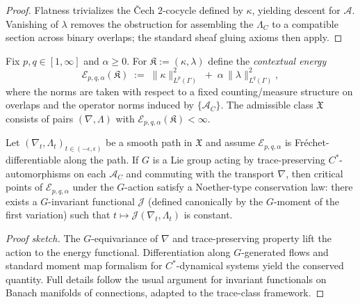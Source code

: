 \begin{proof}
Flatness trivializes the Čech $2$-cocycle defined by $\kappa$, yielding descent for $\mathscr A$. Vanishing of $\lambda$ removes the obstruction for assembling the $\Lambda_C$ to a compatible section across binary overlaps; the standard sheaf gluing axioms then apply. \relax
\end{proof}


\begin{definition}\label{def:energy}
Fix $p,q\in[1,\infty]$ and $\alpha\ge 0$. For $\mathfrak K:=(\kappa,\lambda)$ define the \emph{contextual energy}
\[
\mathcal E_{p,q,\alpha}(\mathfrak K)\;:=\;\|\kappa\|_{L^p(\Gamma)}^2\;+\;\alpha\,\|\lambda\|_{L^q(\Gamma)}^2,
\]
where the norms are taken with respect to a fixed counting/measure structure on overlaps and the operator norms induced by $\{\mathcal A_C\}$. The admissible class $\mathfrak X$ consists of pairs $(\nabla,\Lambda)$ with $\mathcal E_{p,q,\alpha}(\mathfrak K)<\infty$.
\end{definition}

\begin{theorem}\label{thm:stationarity}
Let $(\nabla_t,\Lambda_t)_{t\in(-\epsilon,\epsilon)}$ be a smooth path in $\mathfrak X$ and assume $\mathcal E_{p,q,\alpha}$ is Fréchet-differentiable along the path. If $G$ is a Lie group acting by trace-preserving $C^\ast$-automorphisms on each $\mathcal A_C$ and commuting with the transport $\nabla$, then critical points of $\mathcal E_{p,q,\alpha}$ under the $G$-action satisfy a Noether-type conservation law: there exists a $G$-invariant functional $\mathcal J$ (defined canonically by the $G$-moment of the first variation) such that $t\mapsto\mathcal J(\nabla_t,\Lambda_t)$ is constant.
\end{theorem}

\begin{proof}[Proof sketch]
The $G$-equivariance of $\nabla$ and trace-preserving property lift the action to the energy functional. Differentiation along $G$-generated flows and standard moment map formalism for $C^\ast$-dynamical systems yield the conserved quantity. Full details follow the usual argument for invariant functionals on Banach manifolds of connections, adapted to the trace-class framework. \relax
\end{proof}

